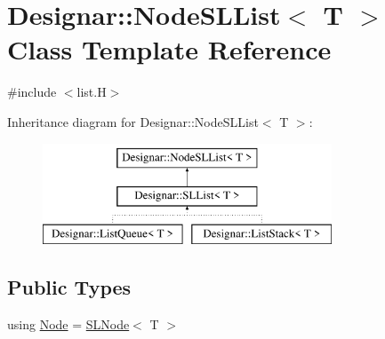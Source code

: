 \hypertarget{class_designar_1_1_node_s_l_list}{}\section{Designar\+:\+:Node\+S\+L\+List$<$ T $>$ Class Template Reference}
\label{class_designar_1_1_node_s_l_list}


{\ttfamily \#include $<$list.\+H$>$}

Inheritance diagram for Designar\+:\+:Node\+S\+L\+List$<$ T $>$\+:\begin{figure}[H]
\begin{center}
\leavevmode
\includegraphics[height=3.000000cm]{class_designar_1_1_node_s_l_list}
\end{center}
\end{figure}
\subsection*{Public Types}
\begin{DoxyCompactItemize}
\item 
using \hyperlink{class_designar_1_1_node_s_l_list_a41963019ada1025099e3259207a3de96}{Node} = \hyperlink{class_designar_1_1_s_l_node}{S\+L\+Node}$<$ T $>$
\end{DoxyCompactItemize}
